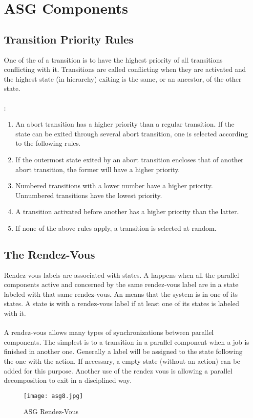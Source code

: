 \documentclass[../main.tex]{subfiles}
\begin{document}
\section{ASG Components}

\subsection{Transition Priority Rules}
One of the  of a transition is to have the highest priority of all transitions conflicting  with it. Transitions are called conflicting when they are activated and the highest state (in hierarchy) exiting is the same, or an ancestor, of the other state.
\\\\
:
\begin{enumerate}
	\item An abort transition has a higher priority than a regular transition. If the state can be exited through several abort transition, one is selected according to the following rules.
	\item If the outermost state exited by an abort transition encloses that of another abort transition, the former will have a higher priority.
	\item Numbered transitions with a lower number have a higher priority. Unnumbered transitions have the lowest priority.
	\item A transition activated before another has a higher priority than the latter.
	\item If none of the above rules apply, a transition is selected at random.
\end{enumerate}

\subsection{The Rendez-Vous}
Rendez-vous labels are associated with states.
A  happens when all the parallel components active and concerned by the same rendez-vous label are in a state labeled with that same rendez-vous.
An  means that the system is in one of its states.
A state is  with a rendez-vous label if at least one of its states is labeled with it.
\\\\
A rendez-vous allows many types of synchronizations between parallel components.
The simplest is to  a transition in a parallel component when a job is finished in another one.
Generally a label will be assigned to the state following the one with the action.
If necessary, a empty state (without an action) can be added for this purpose.
Another use of the rendez vous is allowing a parallel decomposition to exit in a disciplined way.
\begin{figure}[H]
    \centering
    \texttt{[image: asg8.jpg]}
    \caption{ASG Rendez-Vous}
    \label{asg8}
\end{figure}
\end{document}
